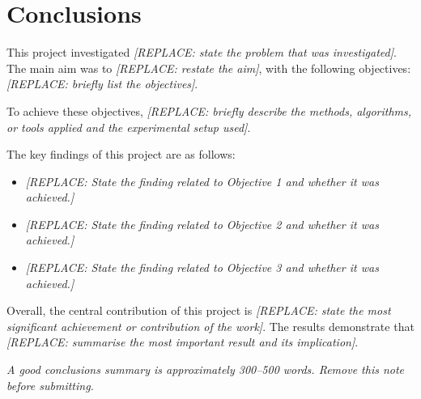 \section{Conclusions}
\label{sec:conclusions}


This project investigated \textit{[REPLACE: state the problem that was 
investigated]}. The main aim was to \textit{[REPLACE: restate the aim]}, 
with the following objectives: \textit{[REPLACE: briefly list the objectives]}.

To achieve these objectives, \textit{[REPLACE: briefly describe the methods, 
algorithms, or tools applied and the experimental setup used]}.

The key findings of this project are as follows:
\begin{itemize}
    \item \textit{[REPLACE: State the finding related to Objective 1 and 
    whether it was achieved.]}
    \item \textit{[REPLACE: State the finding related to Objective 2 and 
    whether it was achieved.]}
    \item \textit{[REPLACE: State the finding related to Objective 3 and 
    whether it was achieved.]}
\end{itemize}

Overall, the central contribution of this project is \textit{[REPLACE: state 
the most significant achievement or contribution of the work]}. The results 
demonstrate that \textit{[REPLACE: summarise the most important result and 
its implication]}.

\noindent\textit{A good conclusions summary is approximately 300--500 words. 
Remove this note before submitting.}

